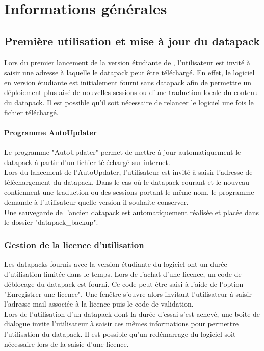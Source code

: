 \chapter{Informations générales}
\section{Première utilisation et mise à jour du datapack}

Lors du premier lancement de la version étudiante de \tria, l'utilisateur est invité à saisir une adresse à laquelle le datapack peut être téléchargé. En effet, le logiciel en version étudiante est initialement fourni sans datapack afin de permettre un déploiement plus aisé de nouvelles sessions ou d'une traduction locale du contenu du datapack. Il est possible qu'il soit nécessaire de relancer le logiciel une fois le fichier téléchargé.\\

\subsubsection{Programme AutoUpdater}
Le programme "AutoUpdater" permet de mettre à jour automatiquement le datapack à partir d'un fichier téléchargé sur internet.\\

Lors du lancement de l'AutoUpdater, l'utilisateur est invité à saisir l'adresse de téléchargement du datapack. Dans le cas où le datapack courant et le nouveau contiennent une traduction ou des sessions portant le même nom, le programme demande à l'utilisateur quelle version il souhaite conserver.\\

Une sauvegarde de l'ancien datapack est automatiquement réalisée et placée dans le dossier "datapack\_backup".


\subsection{Gestion de la licence d'utilisation}
Les datapacks fournis avec la version étudiante du logiciel ont un durée d'utilisation limitée dans le temps. Lors de l'achat d'une licence, un code de déblocage du datapack est fourni. Ce code peut être saisi à l'aide de l'option "Enregistrer une licence". Une fenêtre s'ouvre alors invitant l'utilisateur à saisir l'adresse mail associée à la licence puis le code de validation.\\

Lors de l’utilisation d'un datapack dont la durée d'essai s'est achevé, une boite de dialogue invite l'utilisateur à saisir ces mêmes informations pour permettre l'utilisation du datapack. Il est possible qu'un redémarrage du logiciel soit nécessaire lors de la saisie d'une licence.\\
